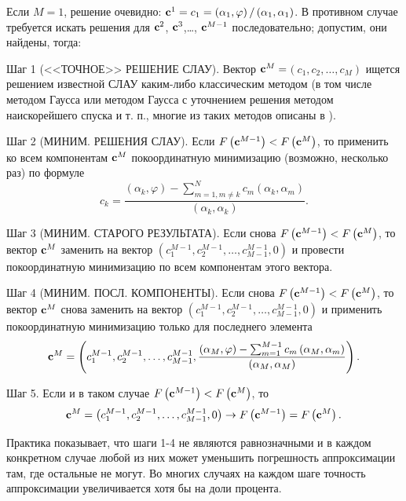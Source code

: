 \documentclass[a4paper]{article}
\begin{document}
Если $M=1$, решение очевидно: ${\bf c}^1=c_1=\left({\alpha }_1,\varphi \right)/\left({\alpha }_1,{\alpha }_1\right)$. В противном случае требуется искать решения для ${\bf c}^2$, ${\bf c}^3$,{\dots}, ${\bf c}^{M-1}$ последовательно; допустим, они найдены, тогда:

  Шаг 1 (<<ТОЧНОЕ>> РЕШЕНИЕ СЛАУ).
        Вектор ${\bf c}^M=$$\left(c_1,c_2,\dots ,c_M\right)$ ищется решением известной СЛАУ каким-либо классическим методом (в том числе методом Гаусса или методом Гаусса с уточнением решения методом наискорейшего спуска и т. п., многие из таких методов описаны в \cite{verzh1}).

        Шаг 2 (МИНИМ. РЕШЕНИЯ СЛАУ). Если $F\left({\bf c}^{M-1}\right)<F\left({\bf c}^M\right)$, то применить ко всем компонентам ${\bf c}^M$ покоординатную минимизацию (возможно, несколько раз) по формуле
        \begin{equation}
          c_k=\frac{\left({\alpha }_k,\varphi \right)-\sum^N_{m=1,m\neq k}{c_m}\left({\alpha }_k,{\alpha }_m\right)}{\left({\alpha }_k,{\alpha }_k\right)}.
        \end{equation}

  Шаг 3 (МИНИМ. СТАРОГО РЕЗУЛЬТАТА). Если снова $F\left({\bf c}^{M-1}\right)<F\left({\bf c}^M\right)$, то вектор ${\bf c}^M$ заменить на вектор $\left(c^{M-1}_1,c^{M-1}_2,\dots ,c^{M-1}_{M-1},0\right)$ и провести покоординатную минимизацию по всем компонентам этого вектора.

 Шаг 4 (МИНИМ. ПОСЛ. КОМПОНЕНТЫ). Если снова $F\left({\bf c}^{M-1}\right)<F\left({\bf c}^M\right)$, то вектор ${\bf c}^M$ снова заменить на вектор $\left(c^{M-1}_1,c^{M-1}_2,\dots ,c^{M-1}_{M-1},0\right)$ и применить покоординатную минимизацию только для последнего элемента
        \begin{equation}{\bf c}^M=\left(c^{M-1}_1,c^{M-1}_2,\dots ,c^{M-1}_{M-1},\frac{\left({\alpha }_M,\varphi \right)-\sum^{M-1}_{m=1}{c_m}\left({\alpha }_M,{\alpha }_m\right)}{\left({\alpha }_M,{\alpha }_M\right)}\right).\end{equation}

  Шаг 5. Если и в таком случае $F\left({\bf c}^{M-1}\right)<F\left({\bf c}^M\right)$, то
        \begin{equation}{\bf c}^M=\left(c^{M-1}_1,c^{M-1}_2,\dots ,c^{M-1}_{M-1},0\right)\to F\left({\bf c}^{M-1}\right)=F\left({\bf c}^M\right).\end{equation}

Практика показывает, что шаги 1-4 не являются равнозначными и в каждом конкретном случае любой из них может уменьшить погрешность аппроксимации там, где остальные не могут.
Во многих случаях на каждом шаге точность аппроксимации увеличивается хотя бы на доли процента.
\end{document}
